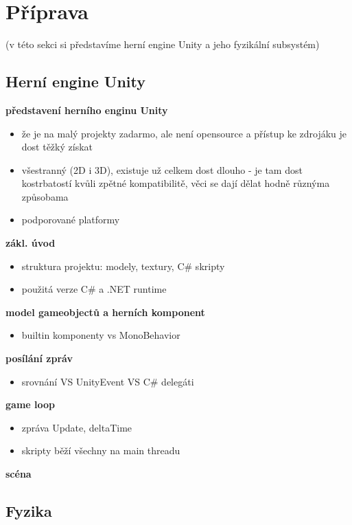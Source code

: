 \chapter{Příprava}
(v této sekci si představíme herní engine Unity a jeho fyzikální subsystém)

\section{Herní engine Unity}


\textbf{představení herního enginu Unity}
\begin{itemize}
    \item že je na malý projekty zadarmo, ale není opensource a přístup ke zdrojáku je dost těžký získat
    \item  všestranný (2D i 3D), existuje už celkem dost dlouho - je tam dost kostrbatostí kvůli zpětné kompatibilitě, věci se dají dělat hodně různýma způsobama
    \item  podporované platformy
\end{itemize}

\textbf{zákl. úvod}
\begin{itemize}
    \item struktura projektu: modely, textury, C\# skripty
    \item použitá verze C\# a .NET runtime
\end{itemize}

\textbf{model gameobjectů a herních komponent}
\begin{itemize}
    \item builtin komponenty vs MonoBehavior
\end{itemize}


\textbf{posílání zpráv}
\begin{itemize}
    \item srovnání VS UnityEvent VS C\# delegáti 
\end{itemize}

\textbf{game loop}
\begin{itemize}
    \item zpráva Update, deltaTime
    \item skripty běží všechny na main threadu
\end{itemize}


\textbf{scéna}


\section{Fyzika}

